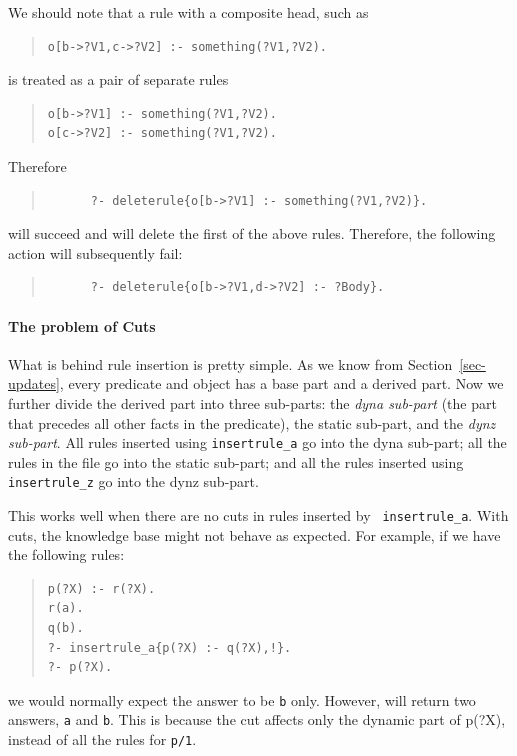 \documentclass[11pt]{article}
\newcommand{\ERGO}{\mbox{\smaller{\ensuremath{\cal{E}}\smaller{{\sc{RGO}}}}}\xspace}
\newcommand{\FLSYSTEM}{\ERGO}
\begin{document}
We should note that a rule with a composite head, such as 
\begin{quote}
   \begin{verbatim}
o[b->?V1,c->?V2] :- something(?V1,?V2).     
   \end{verbatim}
\end{quote}
is treated as a pair of separate rules
\begin{quote}
\begin{verbatim}
o[b->?V1] :- something(?V1,?V2).     
o[c->?V2] :- something(?V1,?V2).     
\end{verbatim}
\end{quote}
Therefore
\begin{quote}
\begin{verbatim}
      ?- deleterule{o[b->?V1] :- something(?V1,?V2)}.
\end{verbatim}
\end{quote}
will succeed and will delete the first of the above rules.
Therefore, the following action will subsequently fail:
\begin{quote}
\begin{verbatim}
      ?- deleterule{o[b->?V1,d->?V2] :- ?Body}.
\end{verbatim}
\end{quote}



\paragraph{The problem of Cuts} What is behind rule insertion is pretty
simple. As we know from Section~\ref{sec-updates}, every predicate and
object has a base part and a derived part. Now we further divide the
derived part into three sub-parts: the \emph{dyna sub-part} (the part that
precedes all other facts in the predicate), the static sub-part, and the
\emph{dynz sub-part}. All rules inserted using {\tt insertrule\_a} go into
the dyna sub-part; all the rules in the file go into the static
sub-part; and all the rules inserted using {\tt insertrule\_z} go into the
dynz sub-part.

This works well when there are no cuts in rules inserted by {\tt
  insertrule\_a}. With cuts, the knowledge base might not
behave as expected. For example, if we have the following rules:
\begin{quote}
\begin{verbatim}
p(?X) :- r(?X).
r(a).
q(b).
?- insertrule_a{p(?X) :- q(?X),!}.
?- p(?X).
\end{verbatim}
\end{quote}
\noindent
we would normally expect the answer to be {\tt b} only. However, \FLSYSTEM will
return two answers, {\tt a} and {\tt b}. This is because the cut affects
only the dynamic part of p(?X), instead of all the rules for {\tt p/1}.
\end{document}
